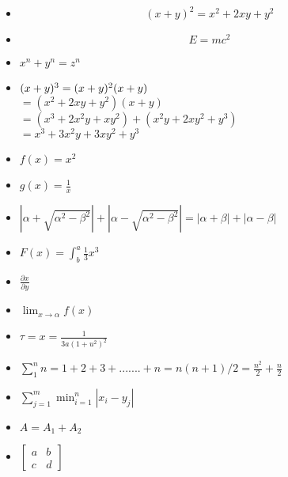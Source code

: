 \documentclass[11pt,a4paper]{article}
\begin{document}
	\begin{itemize}
		\item \begin{equation}
			(x+y)^2 = x^2 + 2xy + y^2
		\end{equation} 
		\item \begin{equation}
			 E = mc^2
		\end{equation}
		\item $ x^n + y^n = z^n $
		\item
		$(x+y)^3\\ = (x+y)^2(x+y)  $ \\
		$  = (x^2 + 2xy + y^2)(x+y)$ \\
		$ = (x^3 + 2x^2y + xy^2) + (x^2y + 2xy^2 + y^3)$ \\ 
		$ = x^3 + 3x^2y + 3xy^2 + y^3$ \\
		\item $ f(x) = x^2$ \\
		\item $ g(x) = \frac{1}{x} $ 
		\item $ |\alpha + \sqrt{\alpha^2 - \beta^2}| + |\alpha - \sqrt{\alpha^2 - \beta^2}| = |\alpha + \beta| + |\alpha - \beta| $
		
		\item $ F(x) = \int_{b}^{a} \frac{1}{3} x^3 $
		\item $ \frac{\partial x}{\partial y} $
		\item $\lim_{x \to \alpha} f(x)$
		\item $ \tau = x = \frac{1}{3a(1+u^2)^2}  $
		\item $ \sum_{1}^{n} n = 1 + 2 + 3 + ....... + n = n(n+1) /2 = \frac{n^2}{2} + \frac{n}{2}  $
		\item $ \sum_{j=1}^{m} \min_{i=1}^{n} |x_i - y_j| $ \\
		\item $ A = A_1 + A_2 $
		\item $ \begin{bmatrix}
			a & b \\
			c & d
		\end{bmatrix} $
	\end{itemize}
\end{document}
